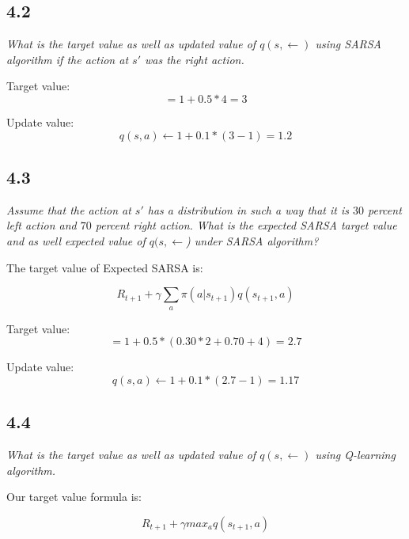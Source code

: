 \documentclass{article}
\begin{document}
\subsection*{4.2}

\textit{ What is the target value as well as updated value of $q(s, \leftarrow)$ using SARSA algorithm if the action at $s'$ was the right action.}

Target value:
\begin{equation}
    = 1 + 0.5 * 4 = 3
\end{equation}

Update value:
\begin{equation}
    q(s,a) \leftarrow 1 + 0.1 * (3 - 1) = 1.2
\end{equation}

\subsection*{4.3}

\textit{Assume that the action at $s'$ has a distribution in such a way that it is $30$ percent left action and $70$ percent right action. What is the expected SARSA target value and as well expected value of $q(s,\leftarrow$) under SARSA algorithm?}

The target value of Expected SARSA is:

\begin{equation}
    R_{t+1} + \gamma \sum_a \pi (a|s_{t+1})q(s_{t+1}, a)
\end{equation}

Target value:
\begin{equation}
    = 1 + 0.5 * ( 0.30 * 2 + 0.70 + 4 ) = 2.7
\end{equation}

Update value:
\begin{equation}
    q(s,a) \leftarrow 1 + 0.1 * (2.7 - 1) = 1.17
\end{equation}

\subsection*{4.4}

\textit{What is the target value as well as updated value of $q(s,\leftarrow)$ using Q-learning algorithm.}

Our target value formula is:

\begin{equation}
    R_{t+1} + \gamma max_a q(s_{t+1}, a)
\end{equation}
\end{document}
